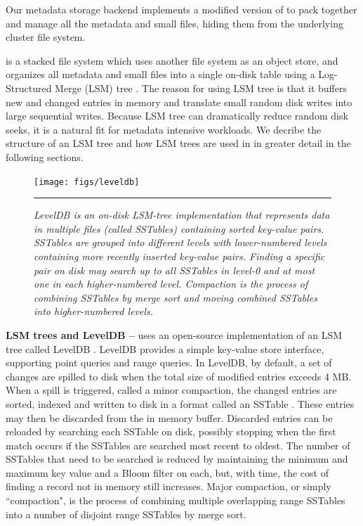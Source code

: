 Our metadata storage backend implements a modified version of \tfs
to pack together and manage all the metadata and small files,
hiding them from the underlying cluster file system.

\tfs \cite{TableFS} is a stacked file system which uses another file system
as an object store, and organizes all metadata and small files into a single
on-disk table using a Log-Structured Merge (LSM) tree \cite{ONeil1996, LevelDB}.
The reason for using LSM tree is that it buffers new and changed entries in
memory and translate small random disk writes into large sequential writes.
Because LSM tree can dramatically reduce random disk seeks,
it is a natural fit for metadata intensive workloads.
We decribe the structure of an LSM tree
and how LSM trees are used in \tfs in greater detail
in the following sections.

\begin{figure}[t]
\texttt{[image: figs/leveldb]}
\vspace{10pt}
\caption{\textit{\footnotesize
LevelDB is an on-disk LSM-tree implementation that represents data in multiple 
files (called SSTables) containing sorted key-value pairs.
SSTables are grouped into different levels with lower-numbered levels
containing more recently inserted key-value pairs.
Finding a specific pair on disk may search up to all SSTables in level-0
and at most one in each higher-numbered level.
Compaction is the process of combining SSTables
by merge sort and moving combined SSTables into higher-numbered levels.
}}
\hrule
\label{fig:leveldb}
\end{figure}


\textbf{LSM trees and LevelDB --}
\tfs uses an open-source implementation of an LSM tree called LevelDB
\cite{LevelDB}. LevelDB provides a simple key-value store interface,
supporting point queries and range queries. In LevelDB, by default,
a set of changes are spilled to disk when the total size of modified
entries exceeds 4 MB.  When a spill is triggered, called a
minor compaction, the changed entries are sorted, indexed and written to disk
in a format called an SSTable \cite{BigTable}.  These entries may then be
discarded from the in memory buffer. Discarded entries
can be reloaded by searching each SSTable
on disk, possibly stopping when the first match occurs if the SSTables are
searched most recent to oldest.  The number of SSTables that need to be
searched is reduced by maintaining the minimum and maximum key value
and a Bloom filter\cite{bloomfilter} on each,
but, with time, the cost of finding a record not in memory still increases.
Major compaction, or simply ``compaction",
is the process of combining multiple overlapping range SSTables
into a number of disjoint range SSTables by merge sort.

